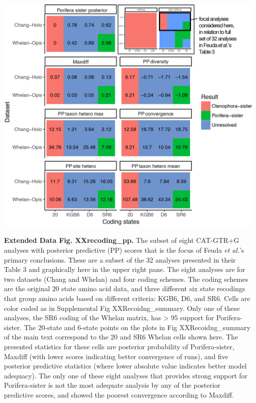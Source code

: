 \documentclass[]{article}
\begin{document}
\includegraphics{figures/Figure_recoding_pp.png}

\textbf{Extended Data Fig. XXrecoding\_pp.} The subset of eight
CAT-GTR+G analyses with posterior predictive (PP) scores that is the
focus of Feuda \emph{et al.}'s primary conclusions. These are a subset
of the 32 analyses presented in their Table 3 and graphically here in
the upper right pane. The eight analyses are for two datasets (Chang and
Whelan) and four coding schemes. The coding schemes are the original 20
state amino acid data, and three different six state recodings that
group amino acids based on different criteria: KGB6, D6, and SR6. Cells
are color coded as in Supplemental Fig XXRecoidng\_summary. Only one of
these analyses, the SR6 coding of the Whelan matrix, has \textgreater{}
95 support for Porifera-sister. The 20-state and 6-state points on the
plots in Fig XXRecoidng\_summary of the main text correspond to the 20
and SR6 Whelan cells shown here. The presented statistics for these
cells are posterior probability of Porifera-sister, Maxdiff (with lower
scores indicating better convergence of runs), and five posterior
predictive statistics (where lower absolute value indicates better model
adequacy). The only one of these eight analyses that provides strong
support for Porifera-sister is not the most adequate analysis by any of
the posterior predictive scores, and showed the poorest convergence
according to Maxdiff.
\end{document}
